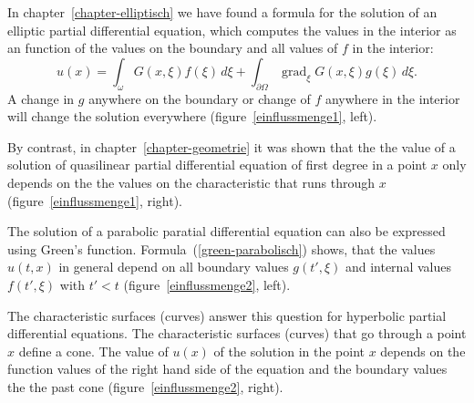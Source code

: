In chapter~\ref{chapter-elliptisch} we have found a formula for the solution
of an elliptic partial differential equation, which computes the 
values in the interior as an function of the values on the boundary
and all values of $f$ in the interior:
\[
u(x)
=
\int_\omega G(x,\xi)f(\xi)\,d\xi
+
\int_{\partial\Omega} \operatorname{grad}_\xi G(x,\xi)g(\xi)\,d\xi.
\]
A change in $g$ anywhere on the boundary or change of $f$ anywhere in the
interior will change the solution everywhere
(figure~\ref{einflussmenge1}, left).

By contrast, in chapter~\ref{chapter-geometrie} it was shown that
the the value of a solution of quasilinear partial differential
equation of first degree in a point $x$ only depends on the the values on
the characteristic that runs through $x$
(figure~\ref{einflussmenge1}, right).

The solution of a parabolic paratial differential equation can also be
expressed using Green's function.
Formula~(\ref{green-parabolisch}) shows, that the values $u(t,x)$
in general depend on all boundary values
$g(t',\xi)$ and internal values $f(t',\xi)$
with $t'<t$ (figure~\ref{einflussmenge2}, left).

The characteristic surfaces (curves) answer this question for hyperbolic
partial differential equations.
The characteristic surfaces (curves) that go through a point $x$
define a cone.
The value of $u(x)$ of the solution in the point $x$ depends on the
function values of the right hand side of the equation and the boundary values
the the past cone
(figure~\ref{einflussmenge2}, right).


